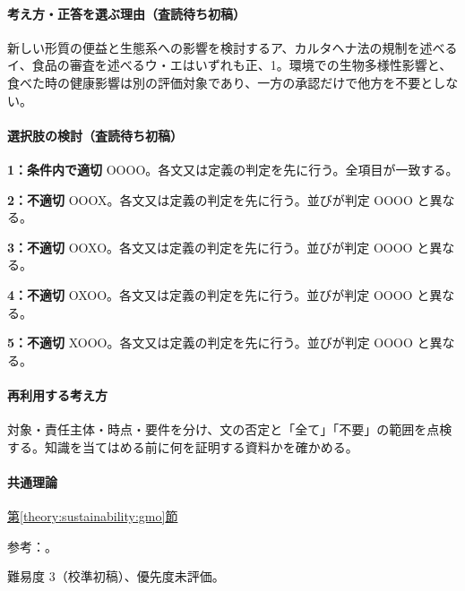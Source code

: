 \paragraph{考え方・正答を選ぶ理由（査読待ち初稿）} 新しい形質の便益と生態系への影響を検討するア、カルタヘナ法の規制を述べるイ、食品の審査を述べるウ・エはいずれも正、1。環境での生物多様性影響と、食べた時の健康影響は別の評価対象であり、一方の承認だけで他方を不要としない。

\paragraph{選択肢の検討（査読待ち初稿）}\mbox{}\par

\noindent\textbf{1：条件内で適切} OOOO。各文又は定義の判定を先に行う。全項目が一致する。\par

\noindent\textbf{2：不適切} OOOX。各文又は定義の判定を先に行う。並びが判定 OOOO と異なる。\par

\noindent\textbf{3：不適切} OOXO。各文又は定義の判定を先に行う。並びが判定 OOOO と異なる。\par

\noindent\textbf{4：不適切} OXOO。各文又は定義の判定を先に行う。並びが判定 OOOO と異なる。\par

\noindent\textbf{5：不適切} XOOO。各文又は定義の判定を先に行う。並びが判定 OOOO と異なる。\par

\paragraph{再利用する考え方} 対象・責任主体・時点・要件を分け、文の否定と「全て」「不要」の範囲を点検する。知識を当てはめる前に何を証明する資料かを確かめる。

\paragraph{共通理論} \hyperref[theory:sustainability:gmo]{第\ref*{theory:sustainability:gmo}節}

\par 参考：\cite{saf53_cartagena,saf53_gmo_food2004,saf53_gmo_standards2000}。

\par 難易度 3（校準初稿）、優先度未評価。

